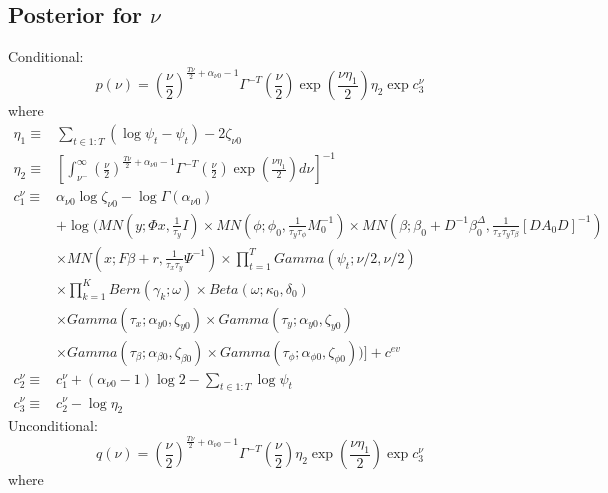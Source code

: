 \documentclass[11pt]{article}
\begin{document}
\subsection{Posterior for $\nu$}
Conditional:
\begin{equation}
	p\left(\nu\right)=\left(\frac{\nu}{2}\right)^{\frac{T\nu}{2}+\alpha_{\nu0}-1}\Gamma^{-T}\left(\frac{\nu}{2}\right)\exp\left(\frac{\nu\eta_{1}}{2}\right)\eta_{2}\exp c_{3}^{\nu}
\end{equation}
where
\begin{align*}
	\eta_{1}\equiv&\sum_{t\in1:T}\left(\log\psi_{t}-\psi_{t}\right)-2\zeta_{\nu0}\\\eta_{2}\equiv&\left[\int_{\nu^{-}}^{\infty}\left(\frac{\nu}{2}\right)^{\frac{T\nu}{2}+\alpha_{\nu0}-1}\Gamma^{-T}\left(\frac{\nu}{2}\right)\exp\left(\frac{\nu\eta_{1}}{2}\right)d\nu\right]^{-1}\\c_{1}^{\nu}\equiv&\alpha_{\nu0}\log\zeta_{\nu0}-\log\Gamma\left(\alpha_{\nu0}\right)\\&+\log\Bigg(MN\left(y;\Phi x,\frac{1}{\tau_{y}}I\right)\times MN\left(\phi;\phi_{0},\frac{1}{\tau_{y}\tau_{\phi}}M_{0}^{-1}\right)\times MN\left(\beta;\beta_{0}+D^{-1}\beta_{0}^{\Delta},\frac{1}{\tau_{x}\tau_{y}\tau_{\beta}}\left[DA_{0}D\right]^{-1}\right)\\&\times MN\left(x;F\beta+r,\frac{1}{\tau_{x}\tau_{y}}\Psi^{-1}\right)\times\prod_{t=1}^{T}Gamma\left(\psi_{t};\nu/2,\nu/2\right)\\&\times\prod_{k=1}^{K}Bern\left(\gamma_{k};\omega\right)\times Beta\left(\omega;\kappa_{0},\delta_{0}\right)\\&\times Gamma\left(\tau_{x};\alpha_{y0},\zeta_{y0}\right)\times Gamma\left(\tau_{y};\alpha_{y0},\zeta_{y0}\right)\\&\times Gamma\left(\tau_{\beta};\alpha_{\beta0},\zeta_{\beta0}\right)\times Gamma\left(\tau_{\phi};\alpha_{\phi0},\zeta_{\phi0}\right)\Bigg)\Bigg]+c^{ev}\\c_{2}^{\nu}\equiv&c_{1}^{\nu}+\left(\alpha_{\nu0}-1\right)\log2-\sum_{t\in1:T}\log\psi_{t}\\c_{3}^{\nu}\equiv&c_{2}^{\nu}-\log\eta_{2}
\end{align*}
Unconditional:
\begin{equation}
	q\left(\nu\right)=\left(\frac{\nu}{2}\right)^{\frac{T\nu}{2}+\alpha_{\nu0}-1}\Gamma^{-T}\left(\frac{\nu}{2}\right)\eta_{2}\exp\left(\frac{\nu\eta_{1}}{2}\right)\exp c_{3}^{\nu}
\end{equation}
where
\end{document}
